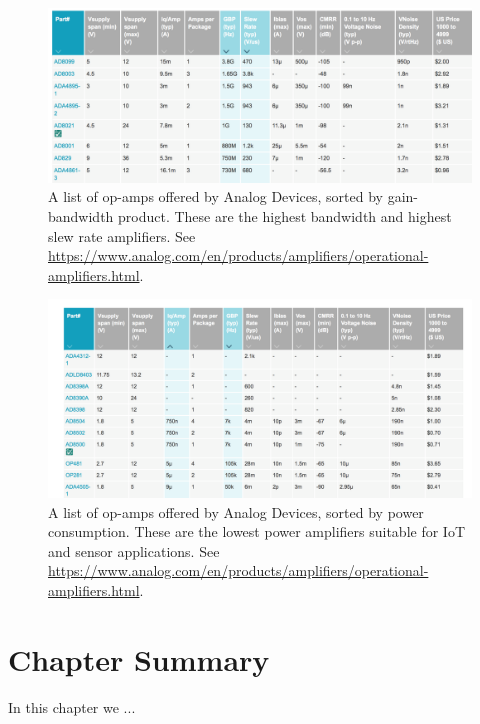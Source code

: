 \begin{figure}[t]
\centering
\includegraphics[width=\columnwidth]{opamp_table.png}
\caption{A list of op-amps offered by Analog Devices, sorted by gain-bandwidth product.  These are the highest bandwidth and highest slew rate amplifiers.  See \url{https://www.analog.com/en/products/amplifiers/operational-amplifiers.html}.}
\label{fig:opamp_table}
\end{figure}
\begin{figure}[H]
\centering
\includegraphics[width=\columnwidth]{opamp_lowpower.png}
\caption{A list of op-amps offered by Analog Devices, sorted by power consumption.  These are the lowest power amplifiers suitable for IoT and sensor applications.  See \url{https://www.analog.com/en/products/amplifiers/operational-amplifiers.html}.}
\label{fig:opamp_lowpower}
\end{figure}
\newpage
\section{Chapter Summary}
In this chapter we ...
